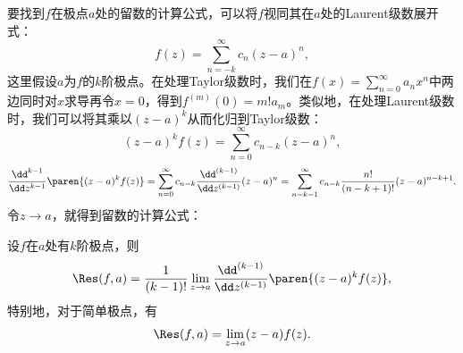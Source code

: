 要找到$f$在极点$a$处的留数的计算公式，可以将$f$视同其在$a$处的Laurent级数展开式：
\begin{equation}
    f(z)=\sum_{n=-k}^{\infty}c_n(z-a)^n,
\end{equation}
这里假设$a$为$f$的$k$阶极点。在处理Taylor级数时，我们在$f(x)=\sum_{n=0}^{\infty}a_n x^n$中两边同时对$x$求导再令$x=0$，得到$f^{(m)}(0)=m!a_m$。类似地，在处理Laurent级数时，我们可以将其乘以$(z-a)^k$从而化归到Taylor级数：
\begin{equation}
    (z-a)^k f(z)=\sum_{n=0}^{\infty}c_{n-k}(z-a)^n,
\end{equation}
\begin{equation}
    \frac{\dd^{k-1}}{\dd z^{k-1}}\paren{(z-a)^k f(z)}=\sum_{n=0}^{\infty}c_{n-k}\frac{\dd^{(k-1)}}{\dd z^{(k-1)}}(z-a)^n=\sum_{n=k-1}^{\infty}c_{n-k}\frac{n!}{(n-k+1)!}(z-a)^{n-k+1}.
\end{equation}
令$z\to a$，就得到留数的计算公式：
\begin{proposition}
    设$f$在$a$处有$k$阶极点，则
    \begin{equation}
        \Res(f,a)=\frac{1}{(k-1)!}\lim_{z\to a}\frac{\dd^{(k-1)}}{\dd z^{(k-1)}}\paren{(z-a)^k f(z)},
    \end{equation}
    特别地，对于简单极点，有
    \begin{equation}
        \Res(f,a)=\lim_{z\to a}(z-a)f(z).
    \end{equation}
\end{proposition}

